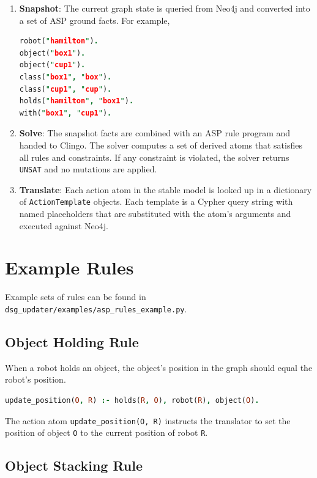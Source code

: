 \documentclass{article}
\begin{document}
\begin{enumerate}
    \item \textbf{Snapshot}: The current graph state is queried from Neo4j
    and converted into a set of ASP ground facts. For example,
\begin{lstlisting}[language=Prolog]
robot("hamilton").
object("box1").
object("cup1").
class("box1", "box").
class("cup1", "cup").
holds("hamilton", "box1").
with("box1", "cup1").\end{lstlisting}
    \item \textbf{Solve}: The snapshot facts are combined with an ASP rule
    program and handed to Clingo. The solver computes a set of derived
    atoms that satisfies all rules and constraints. If any constraint is
    violated, the solver returns \texttt{UNSAT} and no mutations are applied.
    \item \textbf{Translate}: Each action atom in the stable model is looked up
    in a dictionary of \texttt{ActionTemplate} objects. Each template is a
    Cypher query string with named placeholders that are substituted with the
    atom's arguments and executed against Neo4j.
\end{enumerate}

\section{Example Rules}
\label{sec:example_rules}

Example sets of rules can be found in \texttt{dsg\_updater/examples/asp\_rules\_example.py}.

\subsection{Object Holding Rule}

When a robot holds an object, the object's position in the graph should
equal the robot's position.

\begin{lstlisting}[language=Prolog]
update_position(O, R) :- holds(R, O), robot(R), object(O).
\end{lstlisting}

The action atom \texttt{update\_position(O, R)} instructs the translator to
set the position of object \texttt{O} to the current position of robot
\texttt{R}.

\subsection{Object Stacking Rule}
\end{document}
